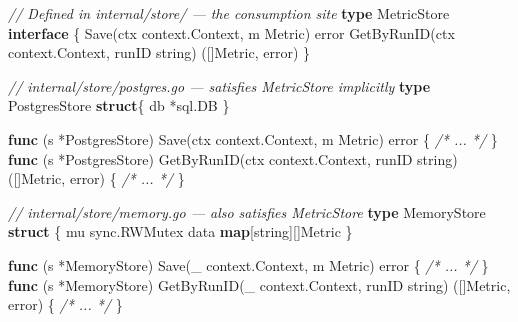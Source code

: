 \documentclass[
]{article}
\newenvironment{Shaded}{}{}
\newcommand{\CommentTok}[1]{\textcolor[rgb]{0.38,0.63,0.69}{\textit{#1}}}
\newcommand{\DataTypeTok}[1]{\textcolor[rgb]{0.56,0.13,0.00}{#1}}
\newcommand{\KeywordTok}[1]{\textcolor[rgb]{0.00,0.44,0.13}{\textbf{#1}}}
\newcommand{\NormalTok}[1]{#1}
\newcommand{\OperatorTok}[1]{\textcolor[rgb]{0.40,0.40,0.40}{#1}}
\begin{document}
\begin{Shaded}
\begin{Highlighting}[]
\CommentTok{// Defined in internal/store/ — the consumption site}
\KeywordTok{type}\NormalTok{ MetricStore }\KeywordTok{interface} \OperatorTok{\{}
\NormalTok{    Save}\OperatorTok{(}\NormalTok{ctx context}\OperatorTok{.}\NormalTok{Context}\OperatorTok{,}\NormalTok{ m Metric}\OperatorTok{)} \DataTypeTok{error}
\NormalTok{    GetByRunID}\OperatorTok{(}\NormalTok{ctx context}\OperatorTok{.}\NormalTok{Context}\OperatorTok{,}\NormalTok{ runID }\DataTypeTok{string}\OperatorTok{)} \OperatorTok{([]}\NormalTok{Metric}\OperatorTok{,} \DataTypeTok{error}\OperatorTok{)}
\OperatorTok{\}}
\end{Highlighting}
\end{Shaded}

\begin{Shaded}
\begin{Highlighting}[]
\CommentTok{// internal/store/postgres.go — satisfies MetricStore implicitly}
\KeywordTok{type}\NormalTok{ PostgresStore }\KeywordTok{struct}\OperatorTok{\{}\NormalTok{ db }\OperatorTok{*}\NormalTok{sql}\OperatorTok{.}\NormalTok{DB }\OperatorTok{\}}

\KeywordTok{func} \OperatorTok{(}\NormalTok{s }\OperatorTok{*}\NormalTok{PostgresStore}\OperatorTok{)}\NormalTok{ Save}\OperatorTok{(}\NormalTok{ctx context}\OperatorTok{.}\NormalTok{Context}\OperatorTok{,}\NormalTok{ m Metric}\OperatorTok{)} \DataTypeTok{error}        \OperatorTok{\{} \CommentTok{/* ... */} \OperatorTok{\}}
\KeywordTok{func} \OperatorTok{(}\NormalTok{s }\OperatorTok{*}\NormalTok{PostgresStore}\OperatorTok{)}\NormalTok{ GetByRunID}\OperatorTok{(}\NormalTok{ctx context}\OperatorTok{.}\NormalTok{Context}\OperatorTok{,}\NormalTok{ runID }\DataTypeTok{string}\OperatorTok{)} \OperatorTok{([]}\NormalTok{Metric}\OperatorTok{,} \DataTypeTok{error}\OperatorTok{)} \OperatorTok{\{} \CommentTok{/* ... */} \OperatorTok{\}}

\CommentTok{// internal/store/memory.go — also satisfies MetricStore}
\KeywordTok{type}\NormalTok{ MemoryStore }\KeywordTok{struct} \OperatorTok{\{}
\NormalTok{    mu   sync}\OperatorTok{.}\NormalTok{RWMutex}
\NormalTok{    data }\KeywordTok{map}\OperatorTok{[}\DataTypeTok{string}\OperatorTok{][]}\NormalTok{Metric}
\OperatorTok{\}}

\KeywordTok{func} \OperatorTok{(}\NormalTok{s }\OperatorTok{*}\NormalTok{MemoryStore}\OperatorTok{)}\NormalTok{ Save}\OperatorTok{(}\NormalTok{\_ context}\OperatorTok{.}\NormalTok{Context}\OperatorTok{,}\NormalTok{ m Metric}\OperatorTok{)} \DataTypeTok{error}            \OperatorTok{\{} \CommentTok{/* ... */} \OperatorTok{\}}
\KeywordTok{func} \OperatorTok{(}\NormalTok{s }\OperatorTok{*}\NormalTok{MemoryStore}\OperatorTok{)}\NormalTok{ GetByRunID}\OperatorTok{(}\NormalTok{\_ context}\OperatorTok{.}\NormalTok{Context}\OperatorTok{,}\NormalTok{ runID }\DataTypeTok{string}\OperatorTok{)} \OperatorTok{([]}\NormalTok{Metric}\OperatorTok{,} \DataTypeTok{error}\OperatorTok{)} \OperatorTok{\{} \CommentTok{/* ... */} \OperatorTok{\}}
\end{Highlighting}
\end{Shaded}
\end{document}
